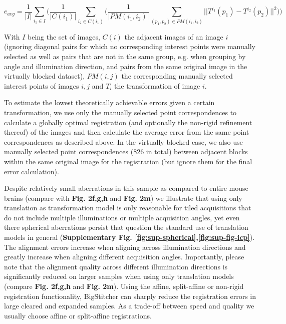 \begin{equation}
\label{eq:regQuality}
e_{avg} = \frac{1}{|I|} \sum_{i_1 \in I} \bigg( \frac{1}{|C(i_1)|} \sum_{i_2 \in C(i_1)} \Big( \frac{1}{|PM(i_1, i_2)|} \sum_{(p_1, p_2) \in PM(i_1, i_2)} || T^{i_1}(p_1) - T^{i_2}(p_2) ||^2 \Big) \bigg)    
\end{equation}

With $I$ being the set of images, $C(i)$ the adjacent images of an image $i$ (ignoring diagonal pairs for which no corresponding interest points were manually selected as well as pairs that are not in the same group, e.g. when grouping by angle and illumination direction, and pairs from the same original image in the virtually blocked dataset), $PM(i,j)$ the corresponding manually selected interest points of images $i,j$ and $T_i$ the transformation of image $i$.

To estimate the lowest theoretically achievable errors given a certain transformation, we use only the manually selected point correspondences to calculate a globally optimal registration (and optionally the non-rigid refinement thereof) of the images and then calculate the average error from the same point correspondences as described above. In the virtually blocked case, we also use manually selected point correspondences (826 in total) between adjacent blocks within the same original image for the registration (but ignore them for the final error calculation). 

Despite relatively small aberrations in this sample as compared to entire mouse brains (compare with \textbf{Fig. 2f,g,h} and \textbf{Fig. 2m}) we illustrate that using only translation as transformation model is only reasonable for tiled acquisitions that do not include multiple illuminations or multiple acquisition angles, yet even there spherical aberrations persist that question the standard use of translation models in general (\textbf{Supplementary Fig. \ref{fig:sup-spherical},\ref{fig:sup-fig-icp}}). The alignment errors increase when aligning across illumination directions and greatly increase when aligning different acquisition angles. Importantly, please note that the alignment quality across different illumination directions is significantly reduced on larger samples when using only translation models (compare \textbf{Fig. 2f,g,h} and \textbf{Fig. 2m}). Using the affine, split-affine or non-rigid registration functionality, BigStitcher can sharply reduce the registration errors in large cleared and expanded samples. As a trade-off between speed and quality we usually choose affine or split-affine registrations.


